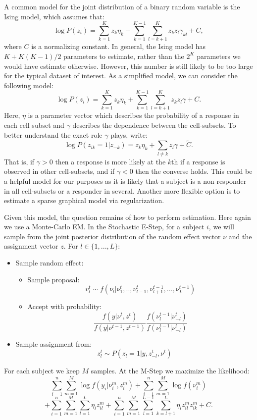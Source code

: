 \documentclass{article}\usepackage[]{graphicx}\usepackage[]{color}
\begin{document}
A common model for the joint distribution of a binary random variable is the Ising model, which assumes that:
$$
\log P(z_i) = \sum_{k=1}^{K} z_{k} \eta_k + \sum_{k=1}^{K - 1}\sum_{l=k + 1}^{K} z_{k} z_{l} \gamma_{kl} + C,
$$
where $C$ is a normalizing constant. In general, the Ising model has $K + K(K-1)/2$ parameters to estimate, rather than the $2^{K}$ parameters we would have estimate otherwise. However, this number is still likely to be too large for the typical dataset of interest. As a simplified model, we can consider the following model:
 $$
\log P(z_i) = \sum_{k=1}^{K} z_{k} \eta_k + \sum_{k=1}^{K - 1}\sum_{l=k + 1}^{K} z_{k} z_{l} \gamma + C.
$$
Here, $\eta$ is a parameter vector which describes the probability of a response in each cell subset and $\gamma$ describes the dependence between the cell-subsets. To better understand the exact role $\gamma$ plays, write:
$$
\log P(z_{ik} = 1| z_{-k}) = z_k\eta_k + \sum_{l\neq k} z_{l} \gamma + \tilde{C}.
$$
That is, if $\gamma > 0$ then a response is more likely at the $k$th if a response is observed in other cell-subsets, and if $\gamma < 0$ then the converse holds. This could be a helpful model for our purposes as it is likely that a subject is a non-responder in all cell-subsets or a responder in several. Another more flexible option is to estimate a sparse graphical model via regularization.

Given this model, the question remains of how to perform estimation. Here again we use a Monte-Carlo EM. In the Stochastic E-Step, for a subject $i$, we will sample from the joint posterior distribution of the random effect vector $\nu$ and the assignment vector $z$. For $l \in \{1,...,L\}$: 
\begin{itemize}
\item Sample random effect:
	\begin{itemize}
	\item Sample proposal:
	$$
	v_l^{t} \sim f(\nu_l | \nu_{1}^{t},..,\nu_{l-1}^{t}, \nu_{l+1}^{t-1},...,\nu_{L}^{t-1})
	$$
	\item  Accept with probability:
	$$
	\frac{f(y | \nu^{t}, z^{t})}{f(y | \nu^{t-1}, z^{t-1})} 
	\frac{f(\nu_l^{t-1}|\nu_{-l}^{t})}{f(\nu_l^{t-1}|\nu_{-l}^{t})}
	$$
	\end{itemize}
	
\item Sample assignment from:
$$
z_l^{t} \sim P(z_l = 1 | y, z_{-l}^{t}, \nu^t)
$$
\end{itemize}
For each subject we keep $M$ samples. At the M-Step we maximize the likelihood:
$$
\sum_{i=1}^{n}\sum_{m=1}^{M} \log f(y_i | \nu_i^m, z^m_i)  +
\sum_{i=1}^{n} \sum_{m=1}^{M} \log f(\nu_i^m)
$$$$
+ \sum_{i=1}^{n}\sum_{m=1}^{M}\sum_{l=1}^{L} \eta_l z_{il}^m
+ \sum_{i=1}^{n}\sum_{m=1}^{M}\sum_{l=1}^{L-1}\sum_{k=l+1}^{L} \eta_l z_{il}^m z_{ik}^{m} + C.
$$
\end{document}
